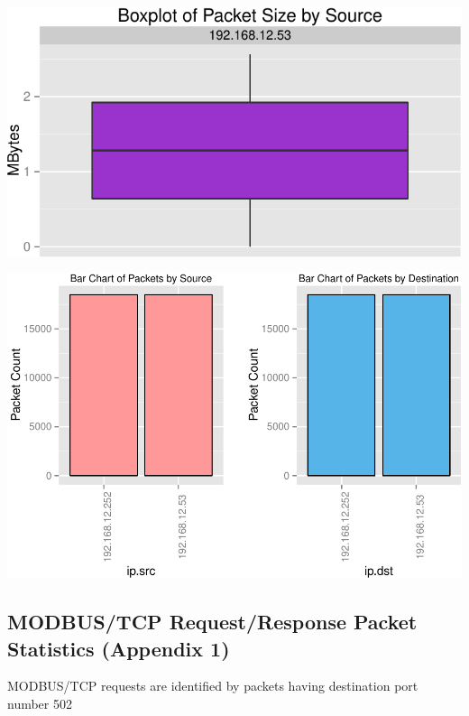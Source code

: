 \documentclass[]{article}
\begin{document}
\begin{center}\includegraphics{modbus_files/figure-latex/unnamed-chunk-7-1} \end{center}

\includegraphics{modbus_files/figure-latex/unnamed-chunk-8-1.pdf}

\pagebreak

\subsection{MODBUS/TCP Request/Response Packet Statistics (Appendix
1)}\label{modbustcp-requestresponse-packet-statistics-appendix-1}

MODBUS/TCP requests are identified by packets having destination port
number 502
\end{document}
